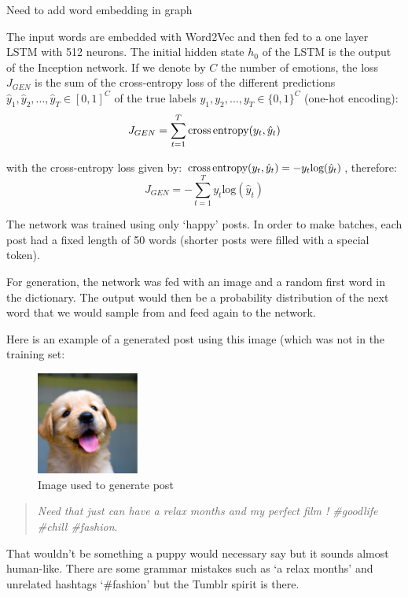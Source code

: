 Need to add word embedding in graph

The input words are embedded with Word2Vec and then fed to a one layer LSTM with 512 neurons. The initial hidden state $h_0$ of the LSTM is the output of the Inception network. If we denote by $C$ the number of emotions, the loss $J_{GEN}$ is the sum of the cross-entropy loss of the different predictions $\hat{y}_1, \hat{y}_2, ..., \hat{y}_T \in [0,1]^C$ of the true labels $y_1, y_2, ..., y_T \in \{0, 1\}^C$ (one-hot encoding):
\begin{equation}
    J_{GEN} = \sum_{t=1}^T \text{cross\,entropy}(y_t, \hat{y}_t)
\end{equation}

with the cross-entropy loss given by: $\text{cross\,entropy}(y_t, \hat{y}_t) = -y_t\text{log}(\hat{y}_t)$, therefore:
\begin{equation}
    J_{GEN} = -\sum_{t=1}^T y_t\text{log}(\hat{y}_t)
\end{equation}

The network was trained using only `happy' posts. In order to make batches, each post had a fixed length of 50 words (shorter posts were filled with a special token).

For generation, the network was fed with an image and a random first word in the dictionary. The output would then be a probability distribution of the next word that we would sample from and feed again to the network.

Here is an example of a generated post using this image (which was not in the training set:
\begin{figure}[H]
    \centering
    \includegraphics[width=0.3\textwidth]{Images/puppy.jpg}
    \caption{Image used to generate post}
\end{figure}

\begin{quote}
    \textit{Need that just can have a relax months and my perfect film ! \#goodlife \#chill \#fashion}.
\end{quote}

That wouldn't be something a puppy would necessary say but it sounds almost human-like. There are some grammar mistakes such as `a relax months' and unrelated hashtags `\#fashion' but the Tumblr spirit is there.







